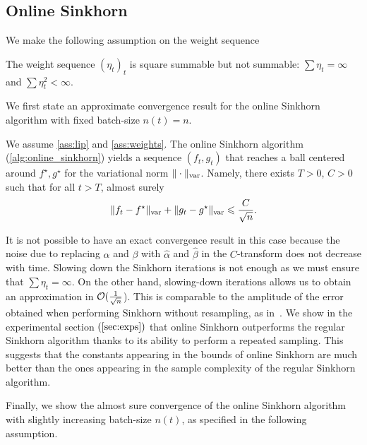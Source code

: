 \subsection{Online Sinkhorn}

We make the following \citet{robbins1951stochastic} assumption on the weight sequence

\begin{assumption}\label{ass:weights}
    The weight sequence ${(\eta_t)}_t$ is square summable but not summable: 
    $\sum \eta_t = \infty$ and $\sum \eta_t^2 < \infty$.
\end{assumption}


We first state an approximate convergence result for the online Sinkhorn algorithm with fixed batch-size $n(t) = n$.

\begin{proposition}\label{prop:convergence_bis}
    We assume \autoref{ass:lip} and \ref{ass:weights}. The online Sinkhorn algorithm (\autoref{alg:online_sinkhorn}) yields a sequence $(f_t, g_t)$ that reaches a
    ball centered around $f^\star, g^\star$ for the variational norm $\Vert
    \cdot \Vert_{\text{\upshape var}}$.
     Namely, there exists $T > 0$, $C > 0$ such that for all $t > T$, almost surely
    \begin{equation}
        \Vert f_t - f^\star \Vert_{\text{\upshape var}}
        + \Vert g_t - g^\star \Vert_{\text{\upshape var}} 
        \leqslant \frac{C}{\sqrt{n}} .
    \end{equation}
\end{proposition}

It is not possible to have an exact convergence result in this case because the noise due
to replacing $\alpha$ and $\beta$ with $\hat \alpha$ and $\hat \beta$ in the
$C$-transform does not decrease with time. Slowing down the Sinkhorn
iterations is not enough as we must ensure that $\sum \eta_t = \infty$. On the
other hand, slowing-down iterations allows us to obtain an approximation in
$\mathcal{O}(\frac{1}{\sqrt{n}}$). This is comparable to the amplitude of the error obtained when
performing Sinkhorn without resampling, as in~\citep{2019-Genevay-aistats}.  We show in
the experimental section $(\autoref{sec:exps})$ that online Sinkhorn 
outperforms the regular Sinkhorn algorithm thanks to its ability to perform a repeated sampling. 
%
This suggests that the constants appearing in the bounds of online Sinkhorn are much
better than the ones appearing in the sample complexity of the regular Sinkhorn
algorithm.

Finally, we show the almost sure convergence of the online Sinkhorn algorithm
with slightly increasing batch-size $n(t)$, as specified in the following
assumption.

